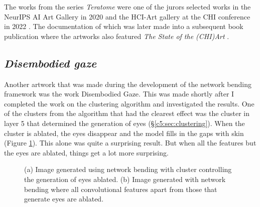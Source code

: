 The works from the series \textit{Teratome} were one of the jurors selected works in the NeurIPS AI Art Gallery in 2020 \citep{broad2020teratome} and the HCI-Art gallery at the CHI conference in 2022 \citep{perry2022art} . 
The documentation of which was later made into a subsequent book publication where the artworks also featured \textit{The State of the (CHI)Art} \citep{sturdee2023chiart}. 

\subsection{\textit{Disembodied gaze}}
\label{c7:subsubsec:disembodied}

Another artwork that was made during the development of the network bending framework was the work Disembodied Gaze. 
This was made shortly after I completed the work on the clustering algorithm and investigated the results. 
One of the clusters from the algorithm that had the clearest effect was the cluster in layer 5 that determined the generation of eyes (\S \ref{c5:sec:clustering}). 
When the cluster is ablated, the eyes disappear and the model fills in the gaps with skin (Figure \ref{fig:c7:eyes-no-eyes}). 
This alone was quite a surprising result. But when all the features but the eyes are ablated, things get a lot more surprising. 

\begin{figure}[!htbp]
    \hfill
    \hfill
    \caption[Network bending eye cluster comparison]{(a) Image generated using network bending with cluster controlling the generation of eyes ablated. (b) Image generated with network bending where all convolutional features apart from those that generate eyes are ablated.}
    \label{fig:c7:eyes-no-eyes}
 \end{figure}

